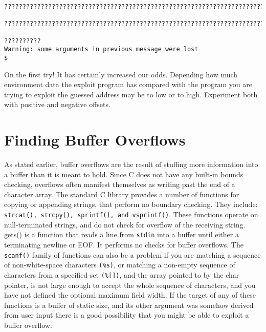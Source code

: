 \documentclass[a4paper]{article}
\begin{document}
\begin{lstlisting}[style=DOS]
???????????????????????????????????????????????????????????????????????????????????????????????????????????????????????????????????????????????????????????????????????????????????????????????????????????????????????????????????????????????????????????????

???????????????????????????????????????????????????????????????????????????????????????????????????????????????????????????????????????????????????????????????????????????????????????????????????????????????????????????????????????????????????????????????

??????????
Warning: some arguments in previous message were lost
$

\end{lstlisting}

On the first try! It has certainly increased our odds. Depending how much environment data the exploit program has compared with the program you are trying to exploit the guessed address may be to low or to high. Experiment both with positive and negative offsets.


\section{Finding Buffer Overflows}

As stated earlier, buffer overflows are the result of stuffing more information into a buffer than it is meant to hold. Since C does not have any built-in bounds checking, overflows often manifest themselves as writing past the end of a character array. The standard C library provides a number of functions for copying or appending strings, that perform no boundary checking. They include: \texttt{strcat(), strcpy(), sprintf(), and vsprintf()}. These functions operate on null-terminated strings, and do not check for overflow of the receiving string. gets() is a function that reads a line from \texttt{stdin} into a buffer until either a terminating newline or EOF. It performs no checks for buffer overflows. The \texttt{scanf()} family of functions can also be a problem if you are matching a sequence of non-white-space characters \texttt{(\%s)}, or matching a non-empty sequence of characters from a specified set \texttt{(\%[])}, and the array pointed to by the char pointer, is not large enough to accept the whole sequence of characters, and you have not defined the optional maximum field width. If the target of any of these functions is a buffer of static size, and its other argument was somehow derived from user input there is a good possibility that you might be able to exploit a buffer overflow.
\end{document}

